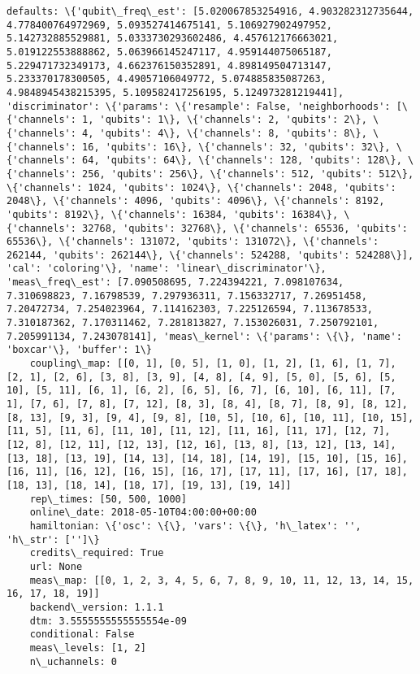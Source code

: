 \documentclass[11pt]{article}
\begin{document}
\begin{Verbatim}[commandchars=\\\{\}]
    defaults: \{'qubit\_freq\_est': [5.020067853254916, 4.903282312735644, 4.778400764972969, 5.093527414675141, 5.106927902497952, 5.142732885529881, 5.0333730293602486, 4.457612176663021, 5.019122553888862, 5.063966145247117, 4.959144075065187, 5.229471732349173, 4.662376150352891, 4.898149504713147, 5.233370178300505, 4.49057106049772, 5.074885835087263, 4.9848945438215395, 5.109582417256195, 5.124973281219441], 'discriminator': \{'params': \{'resample': False, 'neighborhoods': [\{'channels': 1, 'qubits': 1\}, \{'channels': 2, 'qubits': 2\}, \{'channels': 4, 'qubits': 4\}, \{'channels': 8, 'qubits': 8\}, \{'channels': 16, 'qubits': 16\}, \{'channels': 32, 'qubits': 32\}, \{'channels': 64, 'qubits': 64\}, \{'channels': 128, 'qubits': 128\}, \{'channels': 256, 'qubits': 256\}, \{'channels': 512, 'qubits': 512\}, \{'channels': 1024, 'qubits': 1024\}, \{'channels': 2048, 'qubits': 2048\}, \{'channels': 4096, 'qubits': 4096\}, \{'channels': 8192, 'qubits': 8192\}, \{'channels': 16384, 'qubits': 16384\}, \{'channels': 32768, 'qubits': 32768\}, \{'channels': 65536, 'qubits': 65536\}, \{'channels': 131072, 'qubits': 131072\}, \{'channels': 262144, 'qubits': 262144\}, \{'channels': 524288, 'qubits': 524288\}], 'cal': 'coloring'\}, 'name': 'linear\_discriminator'\}, 'meas\_freq\_est': [7.090508695, 7.224394221, 7.098107634, 7.310698823, 7.16798539, 7.297936311, 7.156332717, 7.26951458, 7.20472734, 7.254023964, 7.114162303, 7.225126594, 7.113678533, 7.310187362, 7.170311462, 7.281813827, 7.153026031, 7.250792101, 7.205991134, 7.243078141], 'meas\_kernel': \{'params': \{\}, 'name': 'boxcar'\}, 'buffer': 1\}
    coupling\_map: [[0, 1], [0, 5], [1, 0], [1, 2], [1, 6], [1, 7], [2, 1], [2, 6], [3, 8], [3, 9], [4, 8], [4, 9], [5, 0], [5, 6], [5, 10], [5, 11], [6, 1], [6, 2], [6, 5], [6, 7], [6, 10], [6, 11], [7, 1], [7, 6], [7, 8], [7, 12], [8, 3], [8, 4], [8, 7], [8, 9], [8, 12], [8, 13], [9, 3], [9, 4], [9, 8], [10, 5], [10, 6], [10, 11], [10, 15], [11, 5], [11, 6], [11, 10], [11, 12], [11, 16], [11, 17], [12, 7], [12, 8], [12, 11], [12, 13], [12, 16], [13, 8], [13, 12], [13, 14], [13, 18], [13, 19], [14, 13], [14, 18], [14, 19], [15, 10], [15, 16], [16, 11], [16, 12], [16, 15], [16, 17], [17, 11], [17, 16], [17, 18], [18, 13], [18, 14], [18, 17], [19, 13], [19, 14]]
    rep\_times: [50, 500, 1000]
    online\_date: 2018-05-10T04:00:00+00:00
    hamiltonian: \{'osc': \{\}, 'vars': \{\}, 'h\_latex': '', 'h\_str': ['']\}
    credits\_required: True
    url: None
    meas\_map: [[0, 1, 2, 3, 4, 5, 6, 7, 8, 9, 10, 11, 12, 13, 14, 15, 16, 17, 18, 19]]
    backend\_version: 1.1.1
    dtm: 3.5555555555555554e-09
    conditional: False
    meas\_levels: [1, 2]
    n\_uchannels: 0


\end{Verbatim}
\end{document}
